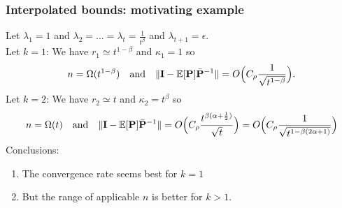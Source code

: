 \documentclass[10pt]{beamer}
\begin{document}
\begin{frame}
  \frametitle{Interpolated bounds: motivating example}
  Let $\lambda_1=1$ and $\lambda_2=...=\lambda_t=\frac1{t^\beta}$ and
  $\lambda_{t+1}=\epsilon$.\\[3mm]
  Let $k=1$: We have $r_1 \simeq  t^{1-\beta}$ and $\kappa_1=1$ so
\begin{align*}
  n=\Omega(t^{1-\beta})\quad\text{and}\quad
  \|\mathbf I-\mathbb E[\mathbf P]\bar{\mathbf P}^{-1}\|= O\Big(C_\rho \frac1{\sqrt{t^{1-\beta}}}\Big). 
\end{align*}
Let $k=2$: We have $r_2 \simeq t$ and $\kappa_2 = t^\beta$ so
\begin{align*}
    n=\Omega(t)\quad\text{and}\quad
  \|\mathbf I-\mathbb E[\mathbf P]\bar{\mathbf P}^{-1}\|= O \Big(C_\rho
  \frac{t^{\beta(\alpha+\frac12)}}{\sqrt{t}}\Big) = O\Big(C_\rho\frac1{\sqrt{t^{1-\beta(2\alpha+1)}}}\Big)
\end{align*}
Conclusions:
\begin{enumerate}
\item The convergence rate seems best for $k=1$
\item But the range of applicable $n$ is better for $k>1$.
\end{enumerate}
\end{frame}

\end{document}
